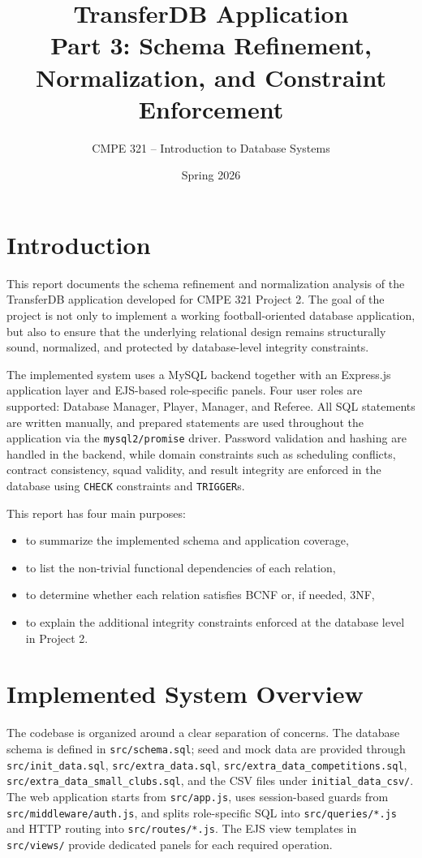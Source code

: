 \documentclass[12pt,a4paper]{article}
\title{\textbf{TransferDB Application\\Part 3: Schema Refinement, Normalization, and Constraint Enforcement}}
\author{CMPE 321 -- Introduction to Database Systems}
\date{Spring 2026}
\begin{document}
\maketitle

\section{Introduction}
This report documents the schema refinement and normalization analysis of the TransferDB application developed for CMPE 321 Project 2. The goal of the project is not only to implement a working football-oriented database application, but also to ensure that the underlying relational design remains structurally sound, normalized, and protected by database-level integrity constraints.

The implemented system uses a MySQL backend together with an Express.js application layer and EJS-based role-specific panels. Four user roles are supported: Database Manager, Player, Manager, and Referee. All SQL statements are written manually, and prepared statements are used throughout the application via the \texttt{mysql2/promise} driver. Password validation and hashing are handled in the backend, while domain constraints such as scheduling conflicts, contract consistency, squad validity, and result integrity are enforced in the database using \texttt{CHECK} constraints and \texttt{TRIGGER}s.

This report has four main purposes:
\begin{itemize}
    \item to summarize the implemented schema and application coverage,
    \item to list the non-trivial functional dependencies of each relation,
    \item to determine whether each relation satisfies BCNF or, if needed, 3NF,
    \item to explain the additional integrity constraints enforced at the database level in Project 2.
\end{itemize}

\section{Implemented System Overview}
The codebase is organized around a clear separation of concerns. The database schema is defined in \texttt{src/schema.sql}; seed and mock data are provided through \texttt{src/init\_data.sql}, \texttt{src/extra\_data.sql}, \texttt{src/extra\_data\_competitions.sql}, \texttt{src/extra\_data\_small\_clubs.sql}, and the CSV files under \texttt{initial\_data\_csv/}. The web application starts from \texttt{src/app.js}, uses session-based guards from \texttt{src/middleware/auth.js}, and splits role-specific SQL into \texttt{src/queries/*.js} and HTTP routing into \texttt{src/routes/*.js}. The EJS view templates in \texttt{src/views/} provide dedicated panels for each required operation.
\end{document}
